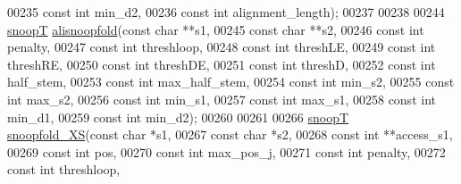 \begin{DoxyCode}
00235                               \textcolor{keyword}{const} \textcolor{keywordtype}{int}   min\_d2,
00236                               \textcolor{keyword}{const} \textcolor{keywordtype}{int}   alignment\_length);
00237 
00238 
00244 \mbox{\hyperlink{group__data__structures_structsnoop_t}{snoopT}} \mbox{\hyperlink{snoop_8h_a544b8eb8da54113d8b852d2c36294290}{alisnoopfold}}(\textcolor{keyword}{const} \textcolor{keywordtype}{char}  **s1,
00245                     \textcolor{keyword}{const} \textcolor{keywordtype}{char}  **s2,
00246                     \textcolor{keyword}{const} \textcolor{keywordtype}{int}   penalty,
00247                     \textcolor{keyword}{const} \textcolor{keywordtype}{int}   threshloop,
00248                     \textcolor{keyword}{const} \textcolor{keywordtype}{int}   threshLE,
00249                     \textcolor{keyword}{const} \textcolor{keywordtype}{int}   threshRE,
00250                     \textcolor{keyword}{const} \textcolor{keywordtype}{int}   threshDE,
00251                     \textcolor{keyword}{const} \textcolor{keywordtype}{int}   threshD,
00252                     \textcolor{keyword}{const} \textcolor{keywordtype}{int}   half\_stem,
00253                     \textcolor{keyword}{const} \textcolor{keywordtype}{int}   max\_half\_stem,
00254                     \textcolor{keyword}{const} \textcolor{keywordtype}{int}   min\_s2,
00255                     \textcolor{keyword}{const} \textcolor{keywordtype}{int}   max\_s2,
00256                     \textcolor{keyword}{const} \textcolor{keywordtype}{int}   min\_s1,
00257                     \textcolor{keyword}{const} \textcolor{keywordtype}{int}   max\_s1,
00258                     \textcolor{keyword}{const} \textcolor{keywordtype}{int}   min\_d1,
00259                     \textcolor{keyword}{const} \textcolor{keywordtype}{int}   min\_d2);
00260 
00261 
00266 \mbox{\hyperlink{group__data__structures_structsnoop_t}{snoopT}} \mbox{\hyperlink{snoop_8h_ac89c43a988a4ed092e21e325dc9a6d3d}{snoopfold\_XS}}(\textcolor{keyword}{const} \textcolor{keywordtype}{char}  *s1,
00267                     \textcolor{keyword}{const} \textcolor{keywordtype}{char}  *s2,
00268                     \textcolor{keyword}{const} \textcolor{keywordtype}{int}   **access\_s1,
00269                     \textcolor{keyword}{const} \textcolor{keywordtype}{int}   pos,
00270                     \textcolor{keyword}{const} \textcolor{keywordtype}{int}   max\_pos\_j,
00271                     \textcolor{keyword}{const} \textcolor{keywordtype}{int}   penalty,
00272                     \textcolor{keyword}{const} \textcolor{keywordtype}{int}   threshloop,

\end{DoxyCode}
